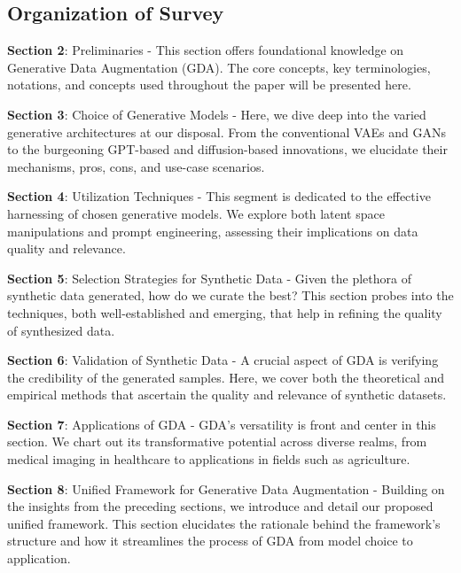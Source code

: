\documentclass[preprint,12pt,authoryear]{elsarticle}
\begin{document}
\subsection{Organization of Survey}
\textbf{Section 2}: Preliminaries - This section offers foundational knowledge on Generative Data Augmentation (GDA). The core concepts, key terminologies, notations, and concepts used throughout the paper will be presented here.

\textbf{Section 3}: Choice of Generative Models - Here, we dive deep into the varied generative architectures at our disposal. From the conventional VAEs\cite{16_VAE,17_VAE,18_VAE,19_VAE,20_VAE,21_VAE} and GANs\cite{22_GAN,23_GAN,24_GAN,25_GAN,26_GAN,27_GAN,28_GAN,29_GAN,30_GAN} to the burgeoning GPT-based\cite{31_GPT,32_GPT,33_GPT,34_GPT,35_GPT,36_GPT,37_GPT,38_GPT,39_GPT,40_GPT} and diffusion-based innovations\cite{41_Diffusion,42_Diffusion,43_Diffusion,44_Diffusion,45_Diffusion,46_Diffusion,47_Diffusion}, we elucidate their mechanisms, pros, cons, and use-case scenarios.

\textbf{Section 4}: Utilization Techniques - This segment is dedicated to the effective harnessing of chosen generative models. We explore both latent space manipulations and prompt engineering, assessing their implications on data quality and relevance.

\textbf{Section 5}: Selection Strategies for Synthetic Data - Given the plethora of synthetic data generated, how do we curate the best? This section probes into the techniques, both well-established and emerging, that help in refining the quality of synthesized data.

\textbf{Section 6}: Validation of Synthetic Data - A crucial aspect of GDA is verifying the credibility of the generated samples. Here, we cover both the theoretical and empirical methods that ascertain the quality and relevance of synthetic datasets.

\textbf{Section 7}: Applications of GDA - GDA's versatility is front and center in this section. We chart out its transformative potential across diverse realms, from medical imaging in healthcare to applications in fields such as agriculture.

\textbf{Section 8}: Unified Framework for Generative Data Augmentation - Building on the insights from the preceding sections, we introduce and detail our proposed unified framework. This section elucidates the rationale behind the framework's structure and how it streamlines the process of GDA from model choice to application.
\end{document}
